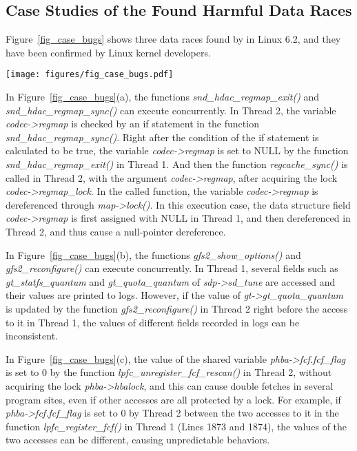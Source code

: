 \subsection{Case Studies of the Found Harmful Data Races}
\label{subsec_case_study}

Figure~\ref{fig_case_bugs} shows three data races found by \sys in Linux 6.2,
and they have been confirmed by Linux kernel developers.

\begin{figure*}[htbp]
	\centering
	\texttt{[image: figures/fig\_case\_bugs.pdf]}
	\label{fig_case_bugs}
\end{figure*}

 In 
Figure~\ref{fig_case_bugs}(a), the functions {\em snd\_hdac\_regmap\_exit()} 
and {\em snd\_hdac\_regmap\_sync()} can execute concurrently. In Thread 2, the 
variable {\em codec->regmap} is checked by an if statement in the function {\em 
snd\_hdac\_regmap\_sync()}. Right after the condition of the if statement is 
calculated to be true, the variable {\em codec->regmap} is set to NULL by the 
function {\em snd\_hdac\_regmap\_exit()} in Thread 1. And then the function 
{\em regcache\_sync()} is called in Thread 2, with the argument {\em 
codec->regmap}, after acquiring the lock {\em codec->regmap\_lock}. In the 
called function, the variable {\em codec->regmap} is dereferenced through 
{\em map->lock()}. In this execution case, the data structure field {\em 
codec->regmap} is first assigned with NULL in Thread 1, and then dereferenced 
in Thread 2, and thus cause a null-pointer dereference.

 In 
Figure~\ref{fig_case_bugs}(b), the functions {\em gfs2\_show\_options()} and 
{\em gfs2\_reconfigure()} can execute concurrently. In Thread 1, several fields 
such as {\em gt\_statfs\_quantum} and {\em gt\_quota\_quantum} of {\em 
sdp->sd\_tune} are accessed and their values are printed to logs. However, if 
the value of {\em gt->gt\_quota\_quantum} is updated by the function {\em 
gfs2\_reconfigure()} in Thread 2 right before the access to it in Thread 1, the 
values of different fields recorded in logs can be inconsistent.

 In Figure~\ref{fig_case_bugs}(c), 
the value of the shared variable {\em phba->fcf.fcf\_flag} is set to 0 by the 
function {\em lpfc\_unregister\_fcf\_rescan()} in Thread 2, without acquiring 
the lock {\em phba->hbalock}, and this can cause double fetches in several 
program sites, even if other accesses are all protected by a lock. For example, 
if {\em phba->fcf.fcf\_flag} is set to 0 by Thread 2 between the two accesses 
to it in the function {\em lpfc\_register\_fcf()} in Thread 1 (Lines 1873 and 
1874), the values of the two accesses can be different, causing unpredictable 
behaviors.

